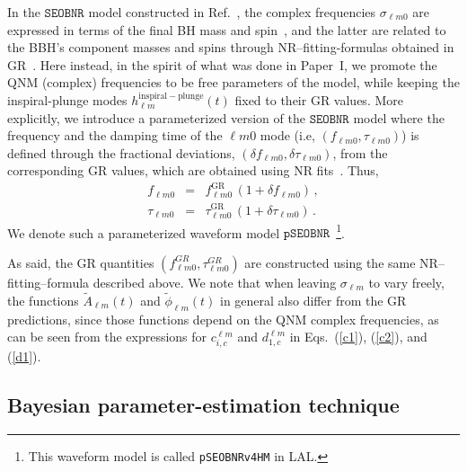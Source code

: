 \documentclass[twocolumn,prd,aps,superscriptaddress,preprintnumbers,tightenlines,showpacs,nofootinbib,eqsecnum,amsfonts,amsmath]{revtex4-1}
\newcommand{\paperone}{Paper~I\xspace}
\newcommand{\pSEOB}{\texttt{pSEOBNR}}
\newcommand{\SEOB}{\texttt{SEOBNR}}
\begin{document}
In the $\SEOB$ model constructed in Ref.~\cite{Cotesta:2018fcv}, the
complex frequencies $\sigma_{\ell m 0}$ are expressed in terms of the
final BH mass and spin~\cite{Berti:2005ys,Berti:2009kk}, and the
latter are related to the BBH's component masses and spins through
NR--fitting-formulas obtained in
GR~\cite{Taracchini:2013rva,Hofmann:2016yih}. Here instead, in the
spirit of what was done in \paperone, we promote the QNM (complex)
frequencies to be free parameters of the model, while keeping the
inspiral-plunge modes $h_{\ell m}^\mathrm{inspiral-plunge}(t)$ fixed
to their GR values. More explicitly, we introduce a parameterized 
version of the $\SEOB$ model where the frequency and the
damping time of the ${\ell m 0}$ mode (i.e, $(f_{\ell m 0}, \tau
_{\ell m 0})$) is defined through the fractional deviations, $(\delta
f_{\ell m 0},\delta \tau_{\ell m 0})$, from the corresponding GR
values, which are obtained using NR fits~\cite{Taracchini:2013rva,Hofmann:2016yih}. Thus,
\begin{eqnarray}
f_{\ell m 0} &=& f_{\ell m 0}^{\text{GR}}\, (1 + \delta f_{\ell m 0})\,,\label{eq:nongr_freqs_a} \\ 
\tau _{\ell m 0} &=& \tau _{\ell m 0}^{\text{GR}}\, (1 + \delta \tau_{\ell m 0})\,. \label{eq:nongr_freqs_b}
\end{eqnarray}
We denote such a parameterized waveform model $\pSEOB$~\footnote{This 
waveform model is called {\tt pSEOBNRv4HM} in LAL.}.

As said, the GR quantities $( f_{\ell m 0}^{GR},\tau_{\ell m 0}^{GR})$ are
constructed using the same NR--fitting--formula 
described above. We note that when leaving $\sigma_{\ell m}$ to vary
freely, the functions $\tilde{A}_{\ell m}(t)$ and $\tilde{\phi}_{\ell
  m}(t)$ in general also differ from the GR predictions, since
those functions depend on the QNM complex frequencies, as can be seen
from the expressions for $c_{i,c}^{\ell m}$ and $d_{1,c}^{\ell m}$ in Eqs.~(\ref{c1}), 
(\ref{c2}), and (\ref{d1}).


\subsection{Bayesian parameter-estimation technique}
\label{sec:method}
\end{document}
